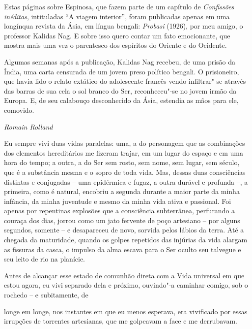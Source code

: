 \thispagestyle{empty}

Estas páginas sobre Espinosa, que fazem parte de um capítulo de
\emph{Confissões inéditas}, intituladas ``A viagem interior'', foram
publicadas apenas em uma longínqua revista da Ásia, em língua bengali:
\emph{Probasi} (1926), por meu amigo, o professor Kalidas Nag. E sobre
isso quero contar um fato emocionante, que mostra mais uma vez o
parentesco dos espíritos do Oriente e do Ocidente.

Algumas semanas após a publicação, Kalidas Nag recebeu, de uma prisão da
Índia, uma carta censurada de um jovem preso político bengali. O
prisioneiro, que havia lido o relato extático do adolescente francês
vendo infiltrar"-se através das barras de sua cela o sol branco do Ser,
reconheceu"-se no jovem irmão da Europa. E, de seu calabouço desconhecido
da Ásia, estendia as mãos para ele, comovido.

\begin{flushright}
\emph{Romain Rolland}
\end{flushright}

\pagebreak
\thispagestyle{empty}
\movetooddpage

Eu sempre vivi duas vidas paralelas: uma, a do personagem que as
combinações dos elementos hereditários me fizeram trajar, em um lugar do
espaço e em uma hora do tempo; a outra, a do Ser sem rosto, sem nome,
sem lugar, sem século, que é a substância mesma e o sopro de toda vida.
Mas, dessas duas consciências distintas e conjugadas -- uma epidérmica e
fugaz, a outra durável e profunda --, a primeira, como é natural,
encobriu a segunda durante a maior parte da minha infância, da minha
juventude e mesmo da minha vida ativa e passional. Foi apenas por
repentinas explosões que a consciência subterrânea, perfurando a couraça
dos dias, jorrou como um jato fervente de poço artesiano -- por alguns
segundos, somente -- e desapareceu de novo, sorvida pelos lábios da
terra. Até a chegada da maturidade, quando os golpes repetidos das
injúrias da vida alargam as fissuras da casca, o impulso da alma escava
para o Ser oculto seu talvegue e seu leito de rio na planície.

Antes de alcançar esse estado de comunhão direta com a Vida universal em
que estou agora, eu vivi separado dela e próximo, ouvindo"-a caminhar
comigo, sob o rochedo -- e subitamente, de \linebreak

\quebra

\noindent{}longe em longe, nos instantes
em que eu menos esperava, era vivificado por essas irrupções de
torrentes artesianas, que me golpeavam a face e me derrubavam.

